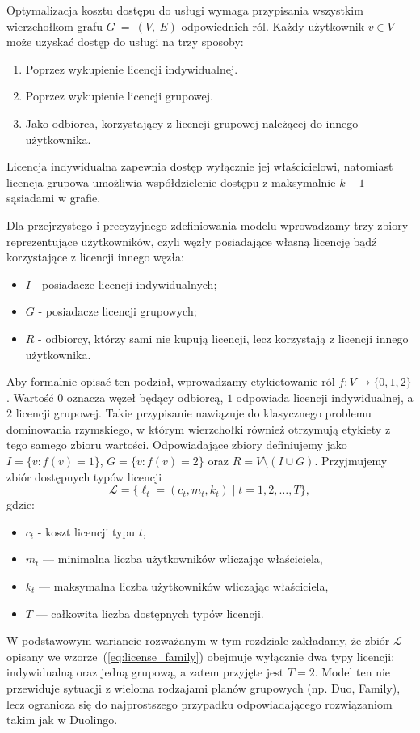 Optymalizacja kosztu dostępu do usługi wymaga przypisania wszystkim wierzchołkom grafu $G ~=~ (V,~E)$ odpowiednich ról. Każdy użytkownik $v \in V$ może uzyskać dostęp do usługi na trzy sposoby:
\begin{enumerate}
    \item Poprzez wykupienie licencji indywidualnej.
    \item Poprzez wykupienie licencji grupowej.
    \item Jako odbiorca, korzystający z licencji grupowej należącej do innego użytkownika.
\end{enumerate}
Licencja indywidualna zapewnia dostęp wyłącznie jej właścicielowi, natomiast licencja grupowa umożliwia współdzielenie dostępu z maksymalnie $k-1$ sąsiadami w grafie.

Dla przejrzystego i precyzyjnego zdefiniowania modelu wprowadzamy trzy zbiory reprezentujące użytkowników, czyli węzły posiadające własną licencję bądź korzystające z licencji innego węzła:
\begin{itemize}
  \item $I$ - posiadacze licencji indywidualnych;
  \item $G$ - posiadacze licencji grupowych;
  \item $R$ - odbiorcy, którzy sami nie kupują licencji, lecz korzystają z licencji innego użytkownika.
\end{itemize}

Aby formalnie opisać ten podział, wprowadzamy etykietowanie ról $f:V\to\{0,1,2\}$.
Wartość $0$ oznacza węzeł będący odbiorcą, $1$ odpowiada licencji indywidualnej, a $2$ licencji grupowej.
Takie przypisanie nawiązuje do klasycznego problemu dominowania rzymskiego, w którym wierzchołki również otrzymują etykiety z tego samego zbioru wartości.
Odpowiadające zbiory definiujemy jako $I=\{v:f(v)=1\}$, $G=\{v:f(v)=2\}$ oraz $R=V\setminus(I\cup G)$.
Przyjmujemy zbiór dostępnych typów licencji
\begin{equation}
  \mathcal{L} = \{ \ell_t = (c_t, m_t, k_t) \mid t = 1,2,\dots,T \},
  \label{eq:license_family}
\end{equation}
gdzie:
\begin{itemize}
  \item $c_t$ - koszt licencji typu $t$,
  \item $m_t$ — minimalna liczba użytkowników wliczając właściciela,
  \item $k_t$ — maksymalna liczba użytkowników wliczając właściciela,
  \item $T$ — całkowita liczba dostępnych typów licencji.
\end{itemize}
W podstawowym wariancie rozważanym w tym rozdziale zakładamy, że zbiór $\mathcal{L}$ opisany we wzorze~(\ref{eq:license_family}) obejmuje wyłącznie dwa typy licencji: indywidualną oraz jedną grupową, a zatem przyjęte jest $T = 2$. Model ten nie przewiduje sytuacji z wieloma rodzajami planów grupowych (np. Duo, Family), lecz ogranicza się do najprostszego przypadku odpowiadającego rozwiązaniom takim jak w Duolingo.

